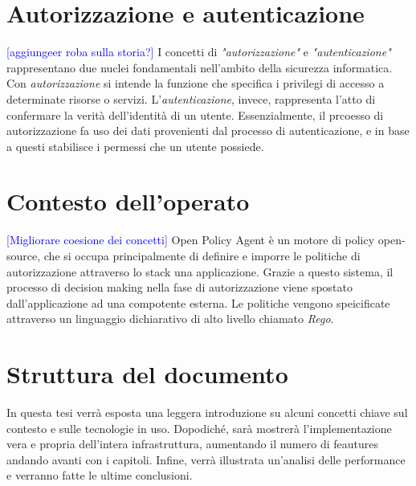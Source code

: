 
\section{Autorizzazione e autenticazione}
\textcolor{blue}{[aggiungeer roba sulla storia?]}
I concetti di \textit{"autorizzazione"} e \textit{"autenticazione"} rappresentano due nuclei fondamentali nell'ambito 
della sicurezza informatica. Con \textit{autorizzazione} si intende la funzione che specifica i privilegi di accesso a determinate risorse o servizi. 
L'\textit{autenticazione}, invece, rappresenta l'atto di confermare la verità dell'identità di un utente.
Essenzialmente, il prcoesso di autorizzazione fa uso dei dati provenienti dal processo di autenticazione, e in base a questi stabilisce i 
permessi che un utente possiede.

\section{Contesto dell'operato}
\textcolor{blue}{[Migliorare coesione dei concetti]}
Open Policy Agent è un motore di policy open-source, che si occupa principalmente di definire e imporre le politiche di autorizzazione attraverso lo stack una applicazione.
Grazie a questo sistema, il processo di decision making nella fase di autorizzazione viene spostato dall'applicazione ad una compotente esterna. 
\newline
Le politiche vengono speicificate attraverso un linguaggio dichiarativo di alto livello chiamato \textit{Rego}.

\section{Struttura del documento}
In questa tesi verrà esposta una leggera introduzione su alcuni concetti chiave sul contesto e sulle tecnologie in uso. 
Dopodiché, sarà mostrerà l'implementazione vera e propria dell'intera infrastruttura, aumentando il numero di feautures andando avanti
con i capitoli. Infine, verrà illustrata un'analisi delle performance e verranno fatte le ultime conclusioni.  

